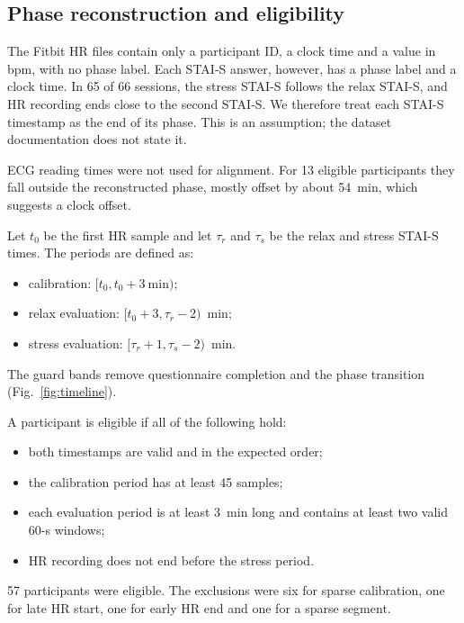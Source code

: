 \documentclass[conference]{IEEEtran}
\begin{document}
\begin{table}[t]
\caption{QoL\_Stress files as inspected (rows and unique participant IDs).}
\label{tab:dataset}
\centering\footnotesize
\resizebox{\columnwidth}{!}{}
\end{table}

\subsection{Phase reconstruction and eligibility}
The Fitbit HR files contain only a participant ID, a clock time and a value in bpm, with no phase label. Each STAI-S answer, however, has a phase label and a clock time. In 65 of 66 sessions, the stress STAI-S follows the relax STAI-S, and HR recording ends close to the second STAI-S. We therefore treat each STAI-S timestamp as the end of its phase. This is an assumption; the dataset documentation does not state it.

ECG reading times were not used for alignment. For 13 eligible participants they fall outside the reconstructed phase, mostly offset by about 54~min, which suggests a clock offset.

Let $t_0$ be the first HR sample and let $\tau_r$ and $\tau_s$ be the relax and stress STAI-S times. The periods are defined as:
\begin{itemize}
\item calibration: $[t_0, t_0{+}3~\mathrm{min})$;
\item relax evaluation: $[t_0{+}3, \tau_r{-}2)$~min;
\item stress evaluation: $[\tau_r{+}1, \tau_s{-}2)$~min.
\end{itemize}
The guard bands remove questionnaire completion and the phase transition (Fig.~\ref{fig:timeline}).

A participant is eligible if all of the following hold:
\begin{itemize}
\item both timestamps are valid and in the expected order;
\item the calibration period has at least 45 samples;
\item each evaluation period is at least 3~min long and contains at least two valid 60-s windows;
\item HR recording does not end before the stress period.
\end{itemize}
57 participants were eligible. The exclusions were six for sparse calibration, one for late HR start, one for early HR end and one for a sparse segment.
\end{document}
